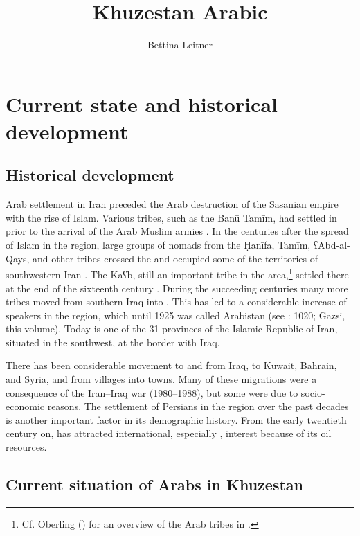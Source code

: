\documentclass[output=paper,nonflat]{langsci/langscibook}
\author{Bettina Leitner\affiliation{University of Vienna}}
\title{Khuzestan Arabic}
\begin{document}
\maketitle  

\section{Current state and historical development} 
\subsection{Historical development}
Arab settlement in Iran preceded the Arab destruction of the Sasanian empire with the rise of Islam. Various tribes, such as the Banū Tamīm, had settled in  prior to the arrival of the Arab Muslim armies \citep[211]{Daniel1986}. In the centuries after the spread of Islam in the region, large groups of nomads from the Ḥanīfa, Tamīm, ʕAbd-al-Qays, and other tribes crossed the   and occupied some of the territories of southwestern Iran \citep[215]{Oberling1986}. The Kaʕb, still an important tribe in the area,\footnote{Cf. Oberling (\citeyear[218]{Oberling1986}) for an overview of the Arab tribes in .} settled there at the end of the sixteenth century \citep[216]{Oberling1986}. During the succeeding centuries many more tribes moved from southern Iraq into . This has led to a considerable increase of  speakers in the region, which until 1925 was called Arabistan (see \citealt{Gazsi2011}: 1020; Gazsi, this volume). Today  is one of the 31 provinces of the Islamic Republic of Iran, situated in the southwest, at the border with Iraq. 

There has been considerable movement to and from Iraq, to Kuwait, Bahrain, and Syria, and from villages into towns. Many of these migrations were a consequence of the Iran–Iraq war (1980–1988), but some were due to socio-economic reasons. The settlement of Persians in the region over the past decades \citep[1020]{Gazsi2011} is another important factor in its demographic history. From the early twentieth century on,  has attracted international, especially , interest because of its oil resources. 

\subsection{Current situation of Arabs in Khuzestan}
\end{document}
